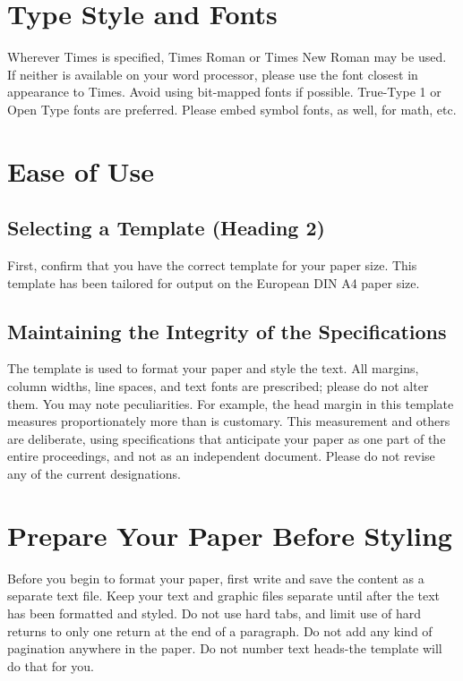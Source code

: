 \documentclass[conference,a4paper,flushend]{neutr}
\begin{document}
\section{Type Style and Fonts}
Wherever Times is specified, Times Roman or Times New Roman may be used. If neither is available on your word processor, please use the font closest in appearance to Times. Avoid using bit-mapped fonts if possible. True-Type 1 or Open Type fonts are preferred. Please embed symbol fonts, as well, for math, etc.

\section{Ease of Use}

\subsection{Selecting a Template (Heading 2)}
First, confirm that you have the correct template for your paper size. This template has been tailored for output on the European DIN A4 paper size.

\subsection{Maintaining the Integrity of the Specifications}
The template is used to format your paper and style the text. All margins, column widths, line spaces, and text fonts are prescribed; please do not alter them. You may note peculiarities. For example, the head margin in this template measures proportionately more than is customary. This measurement and others are deliberate, using specifications that anticipate your paper as one part of the entire proceedings, and not as an independent document. Please do not revise any of the current designations.

\section{Prepare Your Paper Before Styling}

Before you begin to format your paper, first write and save the content as a separate text file. Keep your text and graphic files separate until after the text has been formatted and styled. Do not use hard tabs, and limit use of hard returns to only one return at the end of a paragraph. Do not add any kind of pagination anywhere in the paper. Do not number text heads-the template will do that for you.
\end{document}
